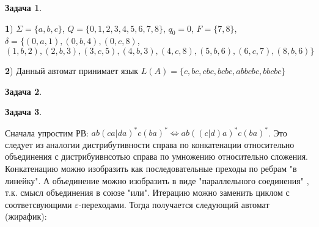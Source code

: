 \documentclass[12pt]{article}
\theoremstyle{definition}
\newtheorem{task}{Задача}
\begin{document}
\begin{task}
\textit{}

\textbf{1}) $\Sigma = \{a,b,c\}$,
 $Q = \{0,1,2,3,4,5,6,7,8\}$, $q_0 = 0$, $F = \{7, 8\}$, 
 $\delta =       \{(0, a, 1), (0, b, 4), (0, c, 8)$, $(1, b, 2), (2, b, 3), (3, c, 5),
(4, b, 3), (4, c, 8), (5, b, 6), (6, c, 7), (8, b, 6)\}$

\textbf{2}) Данный автомат принимает язык $L(A) = \{c, bc, cbc, bcbc, abbcbc, bbcbc\}$

\end{task}


\begin{task}
\textit{}

\end{task}




\begin{task}
\textit{}

Сначала упростим РВ: $ab(ca|da)^*c(ba)^* \Leftrightarrow ab((c|d)a)^*c(ba)^*$. Это следует из аналогии дистрибутивности справа по конкатенации относительно объединения с дистрибуивнсотью справа по умножению относительно сложения. Конкатенацию можно изобразить как последовательные преходы по ребрам "в линейку". А объединение можно изобразить в виде "параллельного соединения" , т.к. смысл объединения в союзе "или". Итерацию можно заменить циклом с соответсвующими $\varepsilon$-переходами. Тогда получается следующий автомат (жирафик):


\end{task}
\end{document}
